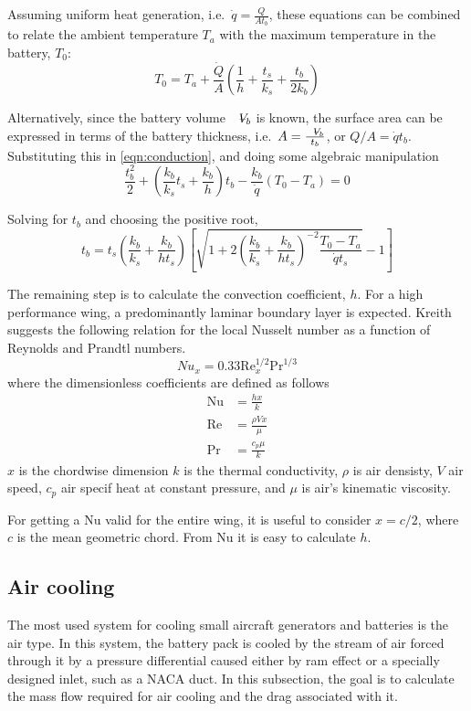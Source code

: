  Assuming uniform heat generation, i.e.\ $\dot{q} = \tfrac{Q}{At_b}$, these equations can be combined to relate the ambient temperature $T_a$ with the maximum temperature in the battery, $T_0$:
 \begin{equation}
    \label{eqn:conduction}
     T_0 = T_a + \frac{\dot{Q}}{A} \left(\frac{1}{h} + \frac{t_s}{k_s} + \frac{t_b}{2k_b} \right)
 \end{equation}
 
Alternatively, since the battery volume $\volume_b$ is known, the surface area can be expressed in terms of the battery thickness, i.e.\ $A = \frac{\volume_b}{t_b}$, or $Q/A = \dot{q} t_b$. Substituting this in \cref{eqn:conduction}, and doing some algebraic manipulation
\begin{equation}
    \frac{t_b^2}{2} + \left(\frac{k_b}{k_s} t_s + \frac{k_b}{h}\right) t_b - \frac{k_b}{\dot{q}}(T_0-T_a) = 0
\end{equation}

Solving for $t_b$ and choosing the positive root,
\begin{equation}
    t_b = t_s\left(\frac{k_b}{k_s} +\frac{k_b}{ht_s}\right)\left[\sqrt{1 + 2\left(\frac{k_b}{k_s} +\frac{k_b}{ht_s}\right)^{-2} \frac{T_0-T_a}{\dot{q}t_s}} - 1\right]
\end{equation}

The remaining step is to calculate the convection coefficient, $h$. For a high performance wing, a predominantly laminar boundary layer is expected. Kreith \cite{kreith} suggests the following relation for the local Nusselt number as a function of Reynolds and Prandtl numbers.
\begin{equation}
    Nu_x = 0.33\text{Re}_x^{1/2}\text{Pr}^{1/3}
\end{equation}
where the dimensionless coefficients are defined as follows
\begin{align}
\text{Nu} &= \frac{hx}{k} \\
\text{Re} &= \frac{\rho V x}{\mu} \\
\text{Pr} &= \frac{c_p \mu}{k}
\end{align}
$x$ is the chordwise dimension $k$ is the thermal conductivity, $\rho$ is air densisty, $V$ air speed, $c_p$ air specif heat at constant pressure, and $\mu$ is air's kinematic viscosity.

For getting a Nu valid for the entire wing, it is useful to consider $x=c/2$, where $c$ is the mean geometric chord. From Nu it is easy to calculate $h$.

\subsection{Air cooling}
\label{sec:air}
The most used system for cooling small aircraft generators and batteries is the air type. In this system, the battery pack is cooled by the stream of air forced through it by a pressure differential caused either by ram effect or a specially designed inlet, such as a NACA duct. In this subsection, the goal is to calculate the mass flow required for air cooling and the drag associated with it.

